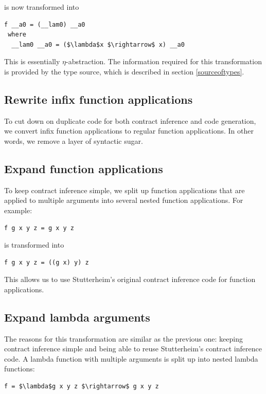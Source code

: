 \documentclass[10pt]{report}
\begin{document}
is now transformed into

\begin{lstlisting}[mathescape, caption=Result of $\eta$-abstraction transformation.]
f __a0 = (__lam0) __a0                
 where                    
  __lam0 __a0 = ($\lambda$x $\rightarrow$ x) __a0
\end{lstlisting}

This is essentially $\eta$-abstraction.
The information required for this transformation is provided by the type source,  which is described in section \ref{sourceoftypes}.

\subsection{Rewrite infix function applications}
To cut down on duplicate code for both contract inference and code generation, we convert infix function applications to regular function applications.
In other words, we remove a layer of syntactic sugar.

\subsection{Expand function applications}
To keep contract inference simple, we split up function applications that are applied to multiple arguments into several nested function applications.
For example:

\begin{lstlisting}
f g x y z = g x y z
\end{lstlisting}

is transformed into

\begin{lstlisting}[caption=Result of function application expansion transformation.]
f g x y z = ((g x) y) z
\end{lstlisting}

This allows us to use Stutterheim's original contract inference code for function applications.

\subsection{Expand lambda arguments}
The reasons for this transformation are similar as the previous one: keeping contract inference simple and being able to reuse Stutterheim's contract inference code.
A lambda function with multiple arguments is split up into nested lambda functions:

\begin{lstlisting}[mathescape]
f = $\lambda$g x y z $\rightarrow$ g x y z
\end{lstlisting}
\end{document}
